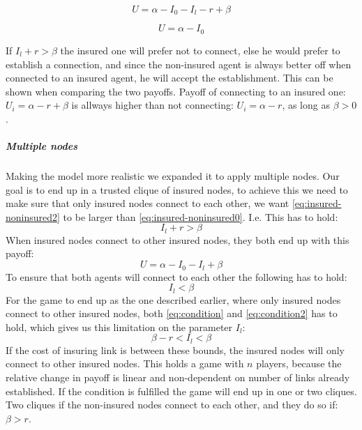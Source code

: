 \begin{equation}
U=\alpha - I_{0} - I_{l} - r + \beta
\label{eq:insured-noninsured0}
\end{equation}

\begin{equation}
U=\alpha - I_{0}
\label{eq:insured-noninsured2}
\end{equation}

If $I_{l}+r>\beta$ the insured one will prefer not to connect, else he would prefer to establish a connection, and since the non-insured agent is always better off when connected to an insured agent, he will accept the establishment. This can be shown when comparing the two payoffs. Payoff of connecting to an insured one: $U_{i}=\alpha - r + \beta$ is allways higher than not connecting: $U_{i}=\alpha - r$, as long as $\beta>0$.
\subparagraph{Multiple nodes}
Making the model more realistic we expanded it to apply multiple nodes. Our goal is to end up in a trusted clique of insured nodes, to achieve this we need to make sure that only insured nodes connect to each other, we want \ref{eq:insured-noninsured2} to be larger than \ref{eq:insured-noninsured0}. I.e. This has to hold:
\begin{equation}
I_{l}+r>\beta
\label{eq:condition}
\end{equation}
When insured nodes connect to other insured nodes, they both end up with this payoff:
\begin{equation}
U=\alpha - I_{0} - I_{l} + \beta
\label{eq:insured-insured}
\end{equation}
To ensure that both agents will connect to each other the following has to hold:
 \begin{equation}
I_{l}<\beta
\label{eq:condition2}
\end{equation}
For the game to end up as the one described earlier, where only insured nodes connect to other insured nodes, both \ref{eq:condition} and \ref{eq:condition2} has to hold, which gives us this limitation on the parameter $I_{l}$:
\begin{equation}
\beta-r<I_{l}<\beta
\label{eq:final condition}
\end{equation}
If the cost of insuring link is between these bounds, the insured nodes will only connect to other insured nodes. This holds a game with $n$ players, because the relative change in payoff is linear and non-dependent on number of links already established. 
If the condition is fulfilled the game will end up in one or two cliques. Two cliques if the non-insured nodes connect to each other, and they do so if: $\beta>r$. 

